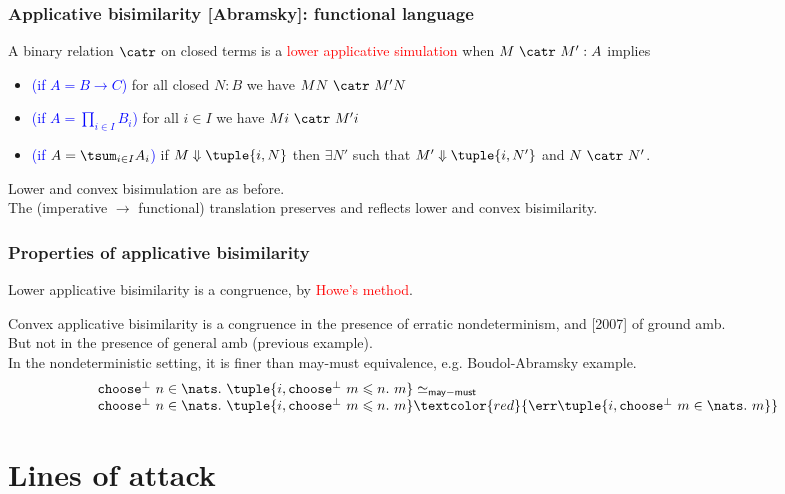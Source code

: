 \documentclass{beamer}
\newcommand{\maymust}{\mathsf{may-must}}
\newcommand{\red}[1]{\textcolor{red}{#1}}
\newcommand{\blue}[1]{\textcolor{blue}{#1}}
\newcommand{\ttchoosebot}{\mathtt{choose}^{\bot}\ }
\begin{document}
\begin{frame}\frametitle{Applicative bisimilarity [Abramsky]: functional language}

A binary relation $\catr$ on closed terms is a \red{lower applicative simulation} when $M\ \catr\ M':A$ implies
\begin{itemize}
\item \blue{(if $A = B \rightarrow C$)} for all closed $N:B$ we have $MN\ \catr\ M' N$
\item \blue{(if $A = \prod_{i \in I} B_{i}$)} for all $i \in I$ we have $M i \ \catr \ M' i$
\item \blue{(if $A = \tsum_{i \in I} A_{i}$)} if $M \Downarrow \tuple{i,N}$ then $\exists N'$ such that $M' \Downarrow \tuple{i,N'}$ and $N \ \catr \ N'$.
\end{itemize}
\medskip
Lower and convex bisimulation are as before. \\
\medskip
The (imperative $\rightarrow$ functional) translation preserves and reflects lower and convex bisimilarity.
  
\end{frame}

\begin{frame}\frametitle{Properties of applicative bisimilarity}

Lower applicative bisimilarity is a congruence, by \red{Howe's method}.\\
\medskip

Convex applicative bisimilarity is a congruence in the presence of erratic nondeterminism, and [2007] of ground amb. \\

\medskip
But not in the presence of general amb (previous example). \\

\medskip  
In the nondeterministic setting, it is finer than may-must equivalence, e.g.
Boudol-Abramsky example.
\begin{displaymath}
  \begin{array}{l}
  \ttchoosebot n \in \nats.\ \tuple{i, \ttchoosebot m\leqslant n.\ m} \simeq_{\maymust}  \\
\ttchoosebot n \in \nats.\ \tuple{i, \ttchoosebot m\leqslant n.\ m} \red{\err
 \tuple{i, \ttchoosebot m \in \nats.\ m}}
\end{array}
\end{displaymath}

\end{frame}

\section{Lines of attack}
\end{document}
